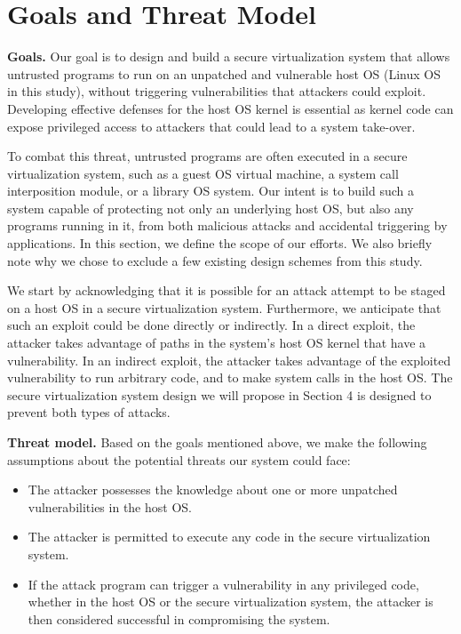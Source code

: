\section{Goals and Threat Model}
\label{sec.motivation-and-background}

\textbf{Goals.}
Our goal is to design and build a secure virtualization system that allows
untrusted programs to run on an unpatched and vulnerable host OS (Linux OS in
this study), without triggering vulnerabilities that attackers could exploit.
Developing effective defenses for the host OS kernel is essential as kernel code
can expose privileged access to attackers that could lead to a system take-over.

To combat this threat, untrusted programs are often executed in a secure
virtualization system, such as a guest OS virtual machine, a system call interposition
module, or a library OS system. Our intent is to
build such a system capable of protecting not only
an underlying host OS, but also any programs running in it, from both malicious attacks
and accidental triggering by applications.
In this section, we define the scope of our efforts. We also briefly note why we
chose to exclude a few existing design schemes from this study.

We start by acknowledging that it is possible for an attack attempt to be staged
on a host OS in a secure virtualization system.
Furthermore, we anticipate that such an exploit could be done directly or indirectly.
In a direct exploit, the attacker
takes advantage of paths in the system's host OS kernel
that have a vulnerability. In an indirect exploit,
the attacker takes advantage of the exploited vulnerability to run arbitrary code, and
to make system calls in the host OS.
The secure virtualization system design we will propose
in Section 4 is designed to prevent both types of attacks.

\noindent
\textbf{Threat model.}
Based on the goals mentioned above, we make the following assumptions about the
potential threats our system could face:

\begin{itemize}\setlength\itemsep{0em}

\item The attacker possesses the knowledge about one or more unpatched vulnerabilities in the host OS.

\item The attacker is permitted to execute any code in the secure virtualization system.

\item If the attack program can trigger a vulnerability in any privileged code,
whether in the host OS or the secure virtualization system, the attacker is then considered successful
in compromising the system.

\end{itemize}

